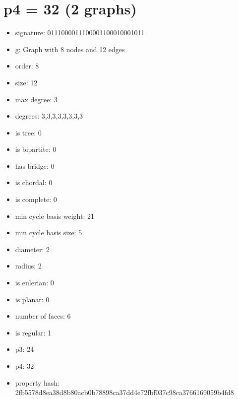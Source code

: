 \chapter{p4 = 32 (2 graphs)}
\newpage\begin{figure}
\end{figure}
\begin{itemize}
\item signature: 0111000011100001100010001011
\item g: Graph with 8 nodes and 12 edges
\item order: 8
\item size: 12
\item max degree: 3
\item degrees: 3,3,3,3,3,3,3,3
\item is tree: 0
\item is bipartite: 0
\item has bridge: 0
\item is chordal: 0
\item is complete: 0
\item min cycle basis weight: 21
\item min cycle basis size: 5
\item diameter: 2
\item radius: 2
\item is eulerian: 0
\item is planar: 0
\item number of faces: 6
\item is regular: 1
\item p3: 24
\item p4: 32
\item property hash: 2fb5578d8ea38d8b80acb0b78898ca37dd4e72fbf037c98ca3766169059b4fd8
\end{itemize}
